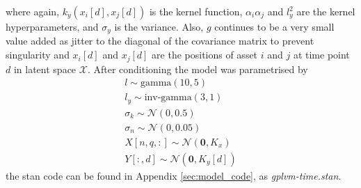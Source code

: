 where again, $k_y(x_i[d], x_j[d])$ is the kernel function, $\alpha_i\alpha_j$ and $l_y^2$ are the kernel hyperparameters, and $\sigma_y$ is the variance. Also, $g$ continues to be a very small value added as jitter to the diagonal of the covariance matrix to prevent singularity and $x_{i}[d]$ and $x_{j}[d]$ are the positions of asset $i$ and $j$ at time point $d$ in latent space $\mathcal{X}$. After conditioning the model was parametrised by
\begin{subequations}
	\label{eq:TD-GPLVM conditioning}
	\begin{align}
	l \sim \text{gamma}(10,5)         \nonumber \\
	l_y \sim \text{inv-gamma}(3,1)         \nonumber \\
	\sigma_k \sim \mathcal{N}(0, 0.5) \nonumber \\
	\sigma_n \sim \mathcal{N}(0, 0.05) \nonumber \\
	X[n,q,:] \sim \mathcal{N}(\bm{0}, K_x) \nonumber \\
	Y[:,d] \sim \mathcal{N}(\bm{0}, K_y[d]) \nonumber
	\end{align}
\end{subequations}
the stan code can be found in Appendix \ref{sec:model_code}, as \textit{gplvm-time.stan}.

